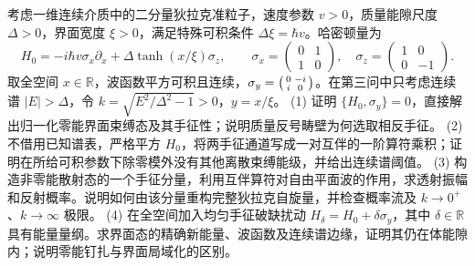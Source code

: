 考虑一维连续介质中的二分量狄拉克准粒子，速度参数 \(v>0\)，质量能隙尺度 \(\Delta>0\)，界面宽度 \(\xi>0\)，满足特殊可积条件 \(\Delta\xi=\hbar v\)。哈密顿量为
\[
H_0=-i\hbar v\sigma_x\partial_x+\Delta\tanh(x/\xi)\sigma_z,\qquad
\sigma_x=\begin{pmatrix}0&1\\1&0\end{pmatrix},\quad
\sigma_z=\begin{pmatrix}1&0\\0&-1\end{pmatrix}.
\]
取全空间 \(x\in\mathbb R\)，波函数平方可积且连续，\(\sigma_y=\begin{psmallmatrix}0&-i\\i&0\end{psmallmatrix}\)。在第三问中只考虑连续谱 \(|E|>\Delta\)，令 \(k=\sqrt{E^2/\Delta^2-1}>0\)，\(y=x/\xi\)。
(1) 证明 \(\{H_0,\sigma_y\}=0\)，直接解出归一化零能界面束缚态及其手征性；说明质量反号畴壁为何选取相反手征。
(2) 不借用已知谱表，严格平方 \(H_0\)，将两手征通道写成一对互伴的一阶算符乘积；证明在所给可积参数下除零模外没有其他离散束缚能级，并给出连续谱阈值。
(3) 构造非零能散射态的一个手征分量，利用互伴算符对自由平面波的作用，求透射振幅和反射概率。说明如何由该分量重构完整狄拉克自旋量，并检查概率流及 \(k\to0^+\)、\(k\to\infty\) 极限。
(4) 在全空间加入均匀手征破缺扰动 \(H_\delta=H_0+\delta\sigma_y\)，其中 \(\delta\in\mathbb R\) 具有能量量纲。求界面态的精确新能量、波函数及连续谱边缘，证明其仍在体能隙内；说明零能钉扎与界面局域化的区别。